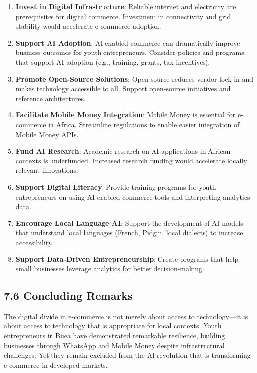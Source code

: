 \documentclass[12pt,a4paper]{article}
\begin{document}
\begin{enumerate}
    \item \textbf{Invest in Digital Infrastructure}: Reliable internet and electricity are prerequisites for digital commerce. Investment in connectivity and grid stability would accelerate e-commerce adoption.
    \item \textbf{Support AI Adoption}: AI-enabled commerce can dramatically improve business outcomes for youth entrepreneurs. Consider policies and programs that support AI adoption (e.g., training, grants, tax incentives).
    \item \textbf{Promote Open-Source Solutions}: Open-source reduces vendor lock-in and makes technology accessible to all. Support open-source initiatives and reference architectures.
    \item \textbf{Facilitate Mobile Money Integration}: Mobile Money is essential for e-commerce in Africa. Streamline regulations to enable easier integration of Mobile Money APIs.
    \item \textbf{Fund AI Research}: Academic research on AI applications in African contexts is underfunded. Increased research funding would accelerate locally relevant innovations.
    \item \textbf{Support Digital Literacy}: Provide training programs for youth entrepreneurs on using AI-enabled commerce tools and interpreting analytics data.
    \item \textbf{Encourage Local Language AI}: Support the development of AI models that understand local languages (French, Pidgin, local dialects) to increase accessibility.
    \item \textbf{Support Data-Driven Entrepreneurship}: Create programs that help small businesses leverage analytics for better decision-making.
\end{enumerate}

\subsection{7.6 Concluding Remarks}

The digital divide in e-commerce is not merely about access to technology---it is about access to technology that is appropriate for local contexts. Youth entrepreneurs in Buea have demonstrated remarkable resilience, building businesses through WhatsApp and Mobile Money despite infrastructural challenges. Yet they remain excluded from the AI revolution that is transforming e-commerce in developed markets.
\end{document}
